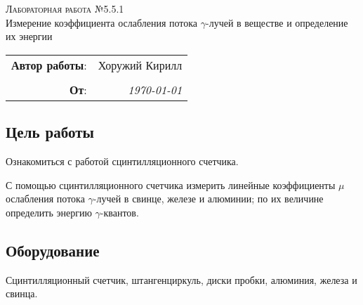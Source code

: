 
\phantom{42}
\vspace{20mm}

\begin{center}
    \LARGE \textsc{Лабораторная работа №5.5.1} \\
    \vspace{3 mm}
    \large Измерение коэффициента ослабления потока $\gamma$-лучей в веществе и определение их энергии
\end{center}


\phantom{42}

\begin{flushright}
    \begin{tabular}{rr}
        \textbf{Автор работы}: 
        & Хоружий Кирилл \\
        & \\
        \textbf{От}: &
        \textit{\today}\\
    \end{tabular}
\end{flushright}

\thispagestyle{empty}

\vspace{10mm}


\subsection*{Цель работы}
\begin{enumerate*}
    \item Ознакомиться с работой сцинтилляционного счетчика.
    \item  С помощью сцинтилляционного счетчика измерить линейные коэффициенты $\mu$ ослабления потока $ \gamma $-лучей в свинце, железе и алюминии; по их величине определить энергию $ \gamma $-квантов.
\end{enumerate*}


\subsection*{Оборудование}
Сцинтилляционный счетчик, штангенциркуль, диски пробки, алюминия, железа и свинца. 



\newpage
